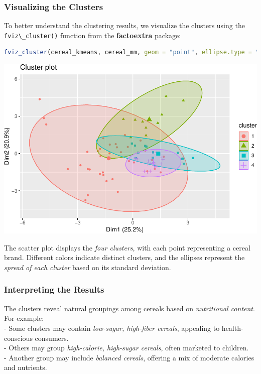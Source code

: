 \documentclass[
]{book}
\newcommand{\passthrough}[1]{#1}
\theoremstyle{definition}
\theoremstyle{definition}
\theoremstyle{definition}
\theoremstyle{definition}
\theoremstyle{remark}
\begin{document}
\subsubsection*{Visualizing the Clusters}\label{visualizing-the-clusters}

To better understand the clustering results, we visualize the clusters using the \passthrough{\lstinline!fviz\_cluster()!} function from the \textbf{factoextra} package:

\begin{lstlisting}[language=R]
fviz_cluster(cereal_kmeans, cereal_mm, geom = "point", ellipse.type = "norm", palette = "custom_palette")
\end{lstlisting}

\begin{center}\includegraphics[width=0.7\linewidth]{clustering_files/figure-latex/unnamed-chunk-12-1} \end{center}

The scatter plot displays the \emph{four clusters}, with each point representing a cereal brand. Different colors indicate distinct clusters, and the ellipses represent the \emph{spread of each cluster} based on its standard deviation.

\subsubsection*{Interpreting the Results}\label{interpreting-the-results}

The clusters reveal natural groupings among cereals based on \emph{nutritional content}. For example:\\
- Some clusters may contain \emph{low-sugar, high-fiber cereals}, appealing to health-conscious consumers.\\
- Others may group \emph{high-calorie, high-sugar cereals}, often marketed to children.\\
- Another group may include \emph{balanced cereals}, offering a mix of moderate calories and nutrients.
\end{document}
